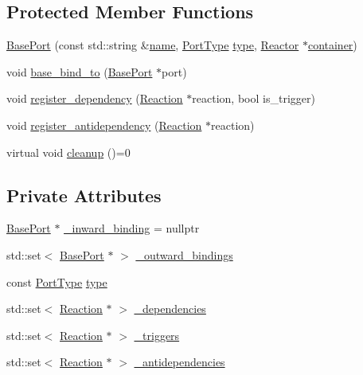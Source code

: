 \subsection*{Protected Member Functions}
\begin{DoxyCompactItemize}
\item 
\hyperlink{classreactor_1_1BasePort_abf23bbb8fdd982044fca7d253ca1d851}{Base\+Port} (const std\+::string \&\hyperlink{classreactor_1_1ReactorElement_a99579f61dbaf5d5d98aebfe26eb8bf77}{name}, \hyperlink{namespacereactor_a08c8e2d85e5bc706b1af8a87e40eec6d}{Port\+Type} \hyperlink{classreactor_1_1BasePort_a9af5e0d55ee1a425b2c5975ab1ca871e}{type}, \hyperlink{classreactor_1_1Reactor}{Reactor} $\ast$\hyperlink{classreactor_1_1ReactorElement_a25bf298de879a82eefc1ba426be05812}{container})
\item 
void \hyperlink{classreactor_1_1BasePort_a58886ca9004547c85b06e7803d0530b1}{base\+\_\+bind\+\_\+to} (\hyperlink{classreactor_1_1BasePort}{Base\+Port} $\ast$port)
\item 
void \hyperlink{classreactor_1_1BasePort_a781809b23cbb205087867bddbd077e17}{register\+\_\+dependency} (\hyperlink{classreactor_1_1Reaction}{Reaction} $\ast$reaction, bool is\+\_\+trigger)
\item 
void \hyperlink{classreactor_1_1BasePort_a1a9831f2c5dfb36c1c0987ab7dcdd608}{register\+\_\+antidependency} (\hyperlink{classreactor_1_1Reaction}{Reaction} $\ast$reaction)
\item 
virtual void \hyperlink{classreactor_1_1BasePort_afe81e6747077349da4c420a873783579}{cleanup} ()=0
\end{DoxyCompactItemize}
\subsection*{Private Attributes}
\begin{DoxyCompactItemize}
\item 
\hyperlink{classreactor_1_1BasePort}{Base\+Port} $\ast$ \hyperlink{classreactor_1_1BasePort_a2a457c372d11a3d959a91f27139a4938}{\+\_\+inward\+\_\+binding} = nullptr
\item 
std\+::set$<$ \hyperlink{classreactor_1_1BasePort}{Base\+Port} $\ast$ $>$ \hyperlink{classreactor_1_1BasePort_ada6d7c004f6529f49428030dfec9b52d}{\+\_\+outward\+\_\+bindings}
\item 
const \hyperlink{namespacereactor_a08c8e2d85e5bc706b1af8a87e40eec6d}{Port\+Type} \hyperlink{classreactor_1_1BasePort_a9af5e0d55ee1a425b2c5975ab1ca871e}{type}
\item 
std\+::set$<$ \hyperlink{classreactor_1_1Reaction}{Reaction} $\ast$ $>$ \hyperlink{classreactor_1_1BasePort_ab6c05497d78f1462ea0969e3feb59137}{\+\_\+dependencies}
\item 
std\+::set$<$ \hyperlink{classreactor_1_1Reaction}{Reaction} $\ast$ $>$ \hyperlink{classreactor_1_1BasePort_a26cdf0eb1d25ebdcdbd576c78f56bf38}{\+\_\+triggers}
\item 
std\+::set$<$ \hyperlink{classreactor_1_1Reaction}{Reaction} $\ast$ $>$ \hyperlink{classreactor_1_1BasePort_ae323964a96ecb4e0d952d7632736464b}{\+\_\+antidependencies}
\end{DoxyCompactItemize}
